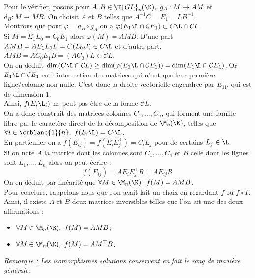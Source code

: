 \documentclass[8pt]{book}
\begin{document}
\begin{enumerate}[leftmargin=*]
		Pour le vérifier, posons pour $A,B\in \T{GL}_n(\K),\ g_A:M\mapsto AM$ et $d_B:M\mapsto MB$. On choisit $A$ et $B$ telles que $A^{-1}C=E_1=LB^{-1}$.\\
		Montrons que pour $\varphi=d_B\circ g_A$ on a $\varphi(E_1\L\cap\mathcal CE_1)\subset C\L\cap\mathcal CL$.\\
		Si $M=E_1L_0=C_0E_1$ alors $\varphi(M)=AMB$. D'une part $AMB=AE_1L_0B=C(L_0B)\in C\L$ et d'autre part, $AMB=AC_0E_1B=(AC_0)L\in \mathcal CL$.\\
		On en déduit $\dim(C\L\cap\mathcal CL)\geq \dim(\varphi(E_1\L\cap\mathcal CE_1))=\dim(E_1\L\cap\mathcal CE_1)$. Or $E_1\L\cap\mathcal CE_1$ est l'intersection des matrices qui n'ont que leur première ligne/colonne non nulle. C'est donc la droite vectorielle engendrée par $E_{11}$, qui est de dimension $1$.\\
		Ainsi, $f(E_i\L_i)$ ne peut pas être de la forme $\mathcal CL$.\\
		On a donc construit des matrices colonnes $C_1,\dots,C_n$, qui forment une famille libre par le caractère direct de la décomposition de $\M_n(\K)$, telles que $\forall i\in \crblanc{1}{n},\ f(E_i\L)=C_i\L$.\\
		En particulier on a $f(E_{ij})=f(E_iE_j^\top)=C_iL_j$ pour de certains $L_j\in \L$.\\
		Si on note $A$ la matrice dont les colonnes sont $C_1,\dots,C_n$ et $B$ celle dont les lignes sont $L_1,\dots,L_n$ alors on peut écrire :
		$$f(E_{ij})=AE_iE_j^\top B=AE_{ij}B$$
		On en déduit par linéarité que $\forall M\in \M_n(\K),\ f(M)=AMB$.\\
		Pour conclure, rappelons nous que l'on avait fait un choix en regardant $f$ ou $f\circ T$. Ainsi, il existe $A$ et $B$ deux matrices inversibles telles que l'on ait une des deux affirmations :
		\begin{itemize}
			\item $\forall M\in \M_n(\K),\ f(M)=AMB$;
			\item $\forall M\in \M_n(\K),\ f(M)=AM^\top B$.
		\end{itemize}
		\textit{Remarque : Les isomorphismes solutions conservent en fait le rang de manière générale.}
	\end{enumerate}
	
\end{document}
